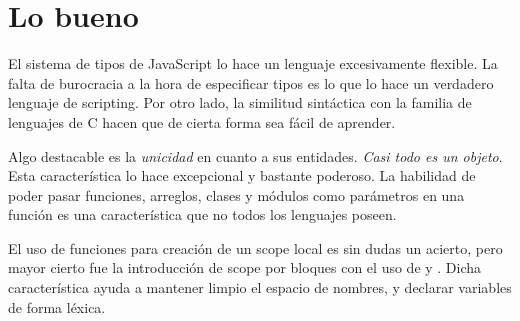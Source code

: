 \section{Lo bueno}

El sistema de tipos de JavaScript lo hace un lenguaje excesivamente flexible. La falta de burocracia a la hora de especificar tipos es lo que lo hace un verdadero lenguaje de scripting. Por otro lado, la similitud sintáctica con la familia de lenguajes de C hacen que de cierta forma sea fácil de aprender. 

Algo destacable es la \textit{unicidad} en cuanto a sus entidades. \textit{Casi todo es un objeto}. Esta característica lo hace excepcional y bastante poderoso. La habilidad de poder pasar funciones, arreglos, clases y módulos como parámetros en una función es una característica que no todos los lenguajes poseen.

El uso de funciones para creación de un scope local es sin dudas un acierto, pero mayor cierto fue la introducción de scope por bloques con el uso de  y . Dicha característica ayuda a mantener limpio el espacio de nombres, y declarar variables de forma léxica.